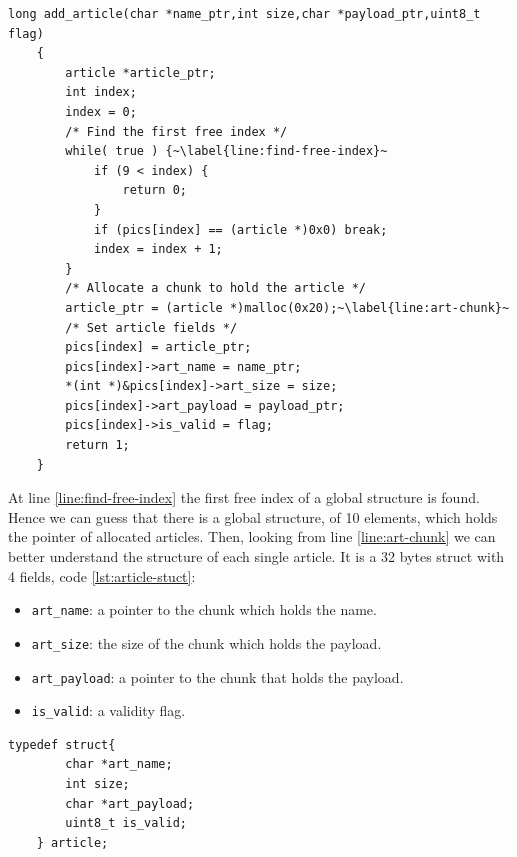 \documentclass{article}
\numberwithin{equation}{subsection}
\begin{document}
\begin{minipage}{\textwidth}
\centering
\lstset{style=cstyle}
\begin{lstlisting}[caption={Add\_article routine of asciigal source code.},captionpos=b,label={lst:add-article-source}]
    long add_article(char *name_ptr,int size,char *payload_ptr,uint8_t flag)
    {
    	article *article_ptr;
    	int index;
    	index = 0;
    	/* Find the first free index */
    	while( true ) {~\label{line:find-free-index}~
    		if (9 < index) {
    			return 0;
    		}
    		if (pics[index] == (article *)0x0) break;
    		index = index + 1;
    	}
    	/* Allocate a chunk to hold the article */
    	article_ptr = (article *)malloc(0x20);~\label{line:art-chunk}~
    	/* Set article fields */
    	pics[index] = article_ptr;
    	pics[index]->art_name = name_ptr;
    	*(int *)&pics[index]->art_size = size;
    	pics[index]->art_payload = payload_ptr;
    	pics[index]->is_valid = flag;
    	return 1;
    }
\end{lstlisting}
\end{minipage}
At line \ref{line:find-free-index} the first free index of a global structure is found. Hence we can guess that there is a global structure, of 10 elements, which holds the pointer of allocated articles. Then, looking from line \ref{line:art-chunk} we can better understand the structure of each single article. It is a 32 bytes struct with 4 fields, code \ref{lst:article-stuct}:
\begin{itemize}
    \item \texttt{art\_name}: a pointer to the chunk which holds the name.
    \item \texttt{art\_size}: the size of the chunk which holds the payload.
    \item \texttt{art\_payload}: a pointer to the chunk that holds the payload.
    \item \texttt{is\_valid}: a validity flag.
\end{itemize}
\begin{minipage}{\textwidth}
\centering
\lstset{style=cstyle}
\begin{lstlisting}[caption={Definition of the struct of an article.},captionpos=b,label={lst:article-stuct}]
    typedef struct{
        char *art_name;
        int size;
        char *art_payload;
        uint8_t is_valid;
    } article;
\end{lstlisting}
\end{minipage}
\end{document}

